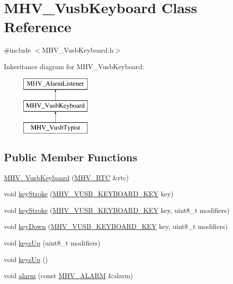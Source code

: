 \hypertarget{class_m_h_v___vusb_keyboard}{
\section{\-M\-H\-V\-\_\-\-Vusb\-Keyboard \-Class \-Reference}
\label{class_m_h_v___vusb_keyboard}
}


{\ttfamily \#include $<$\-M\-H\-V\-\_\-\-Vusb\-Keyboard.\-h$>$}

\-Inheritance diagram for \-M\-H\-V\-\_\-\-Vusb\-Keyboard\-:\begin{figure}[H]
\begin{center}
\leavevmode
\includegraphics[height=3.000000cm]{class_m_h_v___vusb_keyboard}
\end{center}
\end{figure}
\subsection*{\-Public \-Member \-Functions}
\begin{DoxyCompactItemize}
\item 
\hyperlink{class_m_h_v___vusb_keyboard_a97774c8ba7d4d9b736de5da63349a0b2}{\-M\-H\-V\-\_\-\-Vusb\-Keyboard} (\hyperlink{class_m_h_v___r_t_c}{\-M\-H\-V\-\_\-\-R\-T\-C} \&rtc)
\item 
void \hyperlink{class_m_h_v___vusb_keyboard_a01b3de864f8320c23118ac2ff34ca7a7}{key\-Stroke} (\hyperlink{_m_h_v___vusb_keyboard_8h_a03702cf5dad1661f75eda7bd2e33acb6}{\-M\-H\-V\-\_\-\-V\-U\-S\-B\-\_\-\-K\-E\-Y\-B\-O\-A\-R\-D\-\_\-\-K\-E\-Y} key)
\item 
void \hyperlink{class_m_h_v___vusb_keyboard_a6d2161121f4eaef0e41e2b6af956155f}{key\-Stroke} (\hyperlink{_m_h_v___vusb_keyboard_8h_a03702cf5dad1661f75eda7bd2e33acb6}{\-M\-H\-V\-\_\-\-V\-U\-S\-B\-\_\-\-K\-E\-Y\-B\-O\-A\-R\-D\-\_\-\-K\-E\-Y} key, uint8\-\_\-t modifiers)
\item 
void \hyperlink{class_m_h_v___vusb_keyboard_a879506b2ef1622e09070a9ccf11fdd10}{key\-Down} (\hyperlink{_m_h_v___vusb_keyboard_8h_a03702cf5dad1661f75eda7bd2e33acb6}{\-M\-H\-V\-\_\-\-V\-U\-S\-B\-\_\-\-K\-E\-Y\-B\-O\-A\-R\-D\-\_\-\-K\-E\-Y} key, uint8\-\_\-t modifiers)
\item 
void \hyperlink{class_m_h_v___vusb_keyboard_a0dd607bb70fe5f5354f407e8c4f12df1}{keys\-Up} (uint8\-\_\-t modifiers)
\item 
void \hyperlink{class_m_h_v___vusb_keyboard_a02ac5757295595e455ef3103d2ccc1de}{keys\-Up} ()
\item 
void \hyperlink{class_m_h_v___vusb_keyboard_a254b92012ed2a8b5b5549dc4c99a81e4}{alarm} (const \hyperlink{_m_h_v___r_t_c_8h_af13307658f41fba330ffae04dd5cbce6}{\-M\-H\-V\-\_\-\-A\-L\-A\-R\-M} \&alarm)
\end{DoxyCompactItemize}
